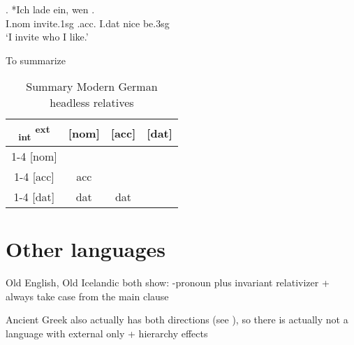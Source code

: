 \exg. *Ich {lade ein}, wen   .\\
I.\ac{nom} invite.1\ac{sg}\scsub{[acc]} .\ac{acc}. I.\ac{dat} nice be.3\ac{sg}\scsub{[nom]}\\
`I invite who I like.' \label{ex:mg-acc-nom}

To summarize

\begin{table}[H]
  \center
  \caption{Summary Modern German headless relatives}
  \begin{tabular}{c|c|c|c}
    \toprule
   \textsubscript{\ac{int}} \textsuperscript{\ac{ext}}
          & [\ac{nom}]
          & [\ac{acc}]
          & [\ac{dat}]
          \\ \cmidrule{1-4}
      [\ac{nom}]
          &
          &
          &
          \\ \cmidrule{1-4}
      [\ac{acc}]
          & \ac{acc}
          &
          &
          \\ \cmidrule{1-4}
      [\ac{dat}]
          & \ac{dat}
          & \ac{dat}
          &
          \\
    \bottomrule
  \end{tabular}
\end{table}


\section{Other languages}






Old English, Old Icelandic both show: -pronoun plus invariant relativizer + always take case from the main clause

Ancient Greek also actually has both directions (see \cite{vanriemsdijk2006}), so there is actually not a language with external only + hierarchy effects


